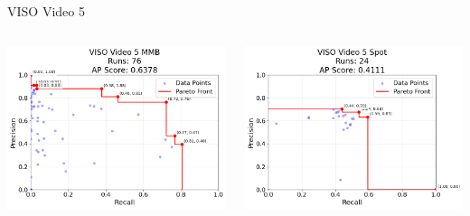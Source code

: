 \begin{frame}{VISO Video 5}
    \begin{columns}
        \begin{column}{0.48\textwidth}
            \centering
            \includegraphics[width=\textwidth,height=0.7\textheight,keepaspectratio]{images/bom/VISO_Video_5_MMB_76.png}
        \end{column}
        \begin{column}{0.48\textwidth}
            \centering
            \includegraphics[width=\textwidth,height=0.7\textheight,keepaspectratio]{images/bom/VISO_Video_5_Spot_24.png}
        \end{column}
    \end{columns}
\end{frame}

